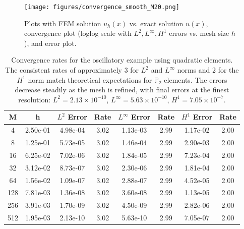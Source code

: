 \documentclass[a4paper,10pt]{article}
\begin{document}
\begin{figure}[H]
	\centering
	\texttt{[image: figures/convergence\_smooth\_M20.png]}
	\caption{Plots with FEM solution \(u_h(x)\) vs. exact solution \(u(x)\), convergence plot (loglog scale with $L^2, L^\infty, H^1$ errors vs. mesh size $h$), and error plot.}
	\label{fig:solution_smooth}
\end{figure}

\begin{table}[ht]
	\centering
		\begin{tabular}{|c|c|c|c|c|c|c|c|}
			\hline
			\rowcolor{blue!25!white} \textbf{M} & \textbf{h} & \textbf{$L^2$ Error} & \textbf{Rate} & \textbf{$L^\infty$ Error} & \textbf{Rate} & \textbf{$H^1$ Error} & \textbf{Rate} \\
			\hline
			4        & 2.50e-01     & 4.98e-04        & 3.02     & 1.13e-03        & 2.99     & 1.17e-02        & 2.00    \\
			\rowcolor{blue!5!white}
			8        & 1.25e-01     & 5.73e-05        & 3.02     & 1.46e-04        & 2.99     & 2.90e-03        & 2.00    \\
			16       & 6.25e-02     & 7.02e-06        & 3.02     & 1.84e-05        & 2.99     & 7.23e-04        & 2.00    \\
			\rowcolor{blue!5!white}
			32       & 3.12e-02     & 8.73e-07        & 3.02     & 2.30e-06        & 2.99     & 1.81e-04        & 2.00    \\
			64       & 1.56e-02     & 1.09e-07        & 3.02     & 2.88e-07        & 2.99     & 4.52e-05        & 2.00    \\
			\rowcolor{blue!5!white}
			128      & 7.81e-03     & 1.36e-08        & 3.02     & 3.60e-08        & 2.99     & 1.13e-05        & 2.00    \\
			256      & 3.91e-03     & 1.70e-09        & 3.02     & 4.50e-09        & 2.99     & 2.82e-06        & 2.00    \\
			\rowcolor{blue!5!white}
			512      & 1.95e-03     & 2.13e-10        & 3.02     & 5.63e-10        & 2.99     & 7.05e-07        & 2.00    \\
			\hline
		\end{tabular}
		\caption{Convergence rates for the oscillatory example using quadratic elements. The consistent rates of approximately 3 for $L^2$ and $L^\infty$ norms and 2 for the $H^1$ norm match theoretical expectations for $\mathbb{P}_2$ elements. The errors decrease steadily as the mesh is refined, with final errors at the finest resolution: $L^2 = 2.13\times10^{-10}$, $L^\infty = 5.63\times10^{-10}$, $H^1 = 7.05\times10^{-7}$.}
		\label{tab:convergence_fancy}
\end{table}
\end{document}
